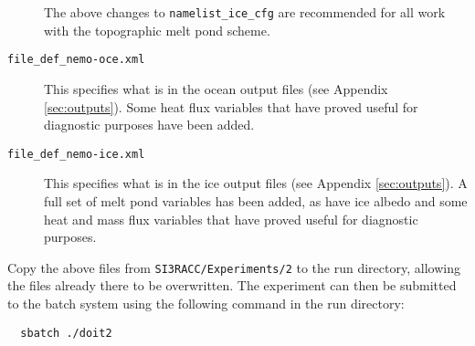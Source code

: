 \begin{description}
        The above changes to \verb|namelist_ice_cfg| are recommended for all work with the topographic melt pond scheme.

    \item[\texttt{file\_def\_nemo-oce.xml}]
        This specifies what is in the ocean output files (see Appendix \ref{sec:outputs}).
        Some heat flux variables that have proved useful for diagnostic purposes have been added.

    \item[\texttt{file\_def\_nemo-ice.xml}]
        This specifies what is in the ice output files (see Appendix \ref{sec:outputs}).
        A full set of melt pond variables has been added, as have ice albedo and some heat and mass flux variables that have proved useful for diagnostic purposes.

\end{description}

Copy the above files from \verb|SI3RACC/Experiments/2| to the run directory, allowing the files already there to be overwritten.
The experiment can then be submitted to the batch system using the following command in the run directory:

\begin{verbatim}
  sbatch ./doit2
\end{verbatim}
